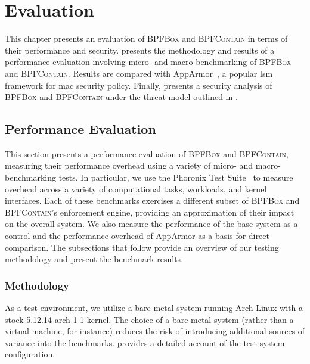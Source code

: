 \documentclass[
  fontsize=12pt,
  titlepage=firstiscover,
  paper=letter,
oneside,
  cleardoublepage=plain,
  parskip=half-,
  DIV=10,
  parindent,
  appendixprefix,
  chapterprefix,
  listof=totoc,
]{scrbook}
\newcommand{\bpfbox}{\textsc{BPFBox}}
\newcommand{\bpfcontain}{\textsc{BPFContain}}
\begin{document}
\chapter{Evaluation}\label{c:evaluation}
This chapter presents an evaluation of \bpfbox{} and \bpfcontain{} in terms of their
performance and security.  presents the methodology and results
of a performance evaluation involving micro- and macro-benchmarking of \bpfbox{} and
\bpfcontain{}. Results are compared with AppArmor~\cite{cowan2000_apparmor}, a popular
\gls{lsm} framework for \gls{mac} security policy. Finally, 
presents a security analysis of \bpfbox{} and \bpfcontain{} under the threat model
outlined in .

\section{Performance Evaluation}\label{s:eval-performance}

This section presents a performance evaluation of \bpfbox{} and \bpfcontain{}, measuring
their performance overhead using a variety of micro- and macro-benchmarking tests. In
particular, we use the Phoronix Test Suite~\cite{phoronix} to measure overhead across
a variety of computational tasks, workloads, and kernel interfaces. Each of these
benchmarks exercises a different subset of \bpfbox{} and \bpfcontain{}'s enforcement
engine, providing an approximation of their impact on the overall system. We also measure
the performance of the base system as a control and the performance overhead of AppArmor
as a basis for direct comparison. The subsections that follow provide an overview of our
testing methodology and present the benchmark results.

\subsection{Methodology}\label{ss:eval-methodology}

As a test environment, we utilize a bare-metal system running Arch Linux with a stock
5.12.14-arch-1-1 kernel. The choice of a bare-metal system (rather than a virtual machine,
for instance) reduces the risk of introducing additional sources of variance into the
benchmarks.  provides a detailed account of the test system
configuration.
\end{document}
